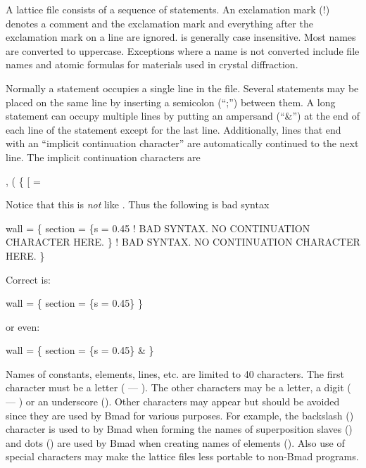 A \bmad lattice file consists of a sequence of statements. An
exclamation mark (!) denotes a comment and the exclamation mark and
everything after the exclamation mark on a line are ignored.  \bmad is
generally case insensitive. Most names are converted to
uppercase. Exceptions where a name is not converted include file names
and atomic formulas for materials used in crystal diffraction.

Normally a statement occupies a single line in the file. Several
statements may be placed on the same line by inserting a semicolon
(``;'') between them. A long statement can occupy multiple lines by
putting an ampersand (``\&'') at the end of each line of the statement
except for the last line. Additionally, lines that end with an
``implicit continuation character''
are automatically continued to the next line. The implicit continuation 
characters are
\begin{example}
  ,   (   \{   [   =
\end{example}
Notice
that this is {\em not} like . Thus the following is bad syntax
\begin{example}
  wall = \{
    section = \{s = 0.45     ! BAD SYNTAX. NO CONTINUATION CHARACTER HERE.
    \}                       ! BAD SYNTAX. NO CONTINUATION CHARACTER HERE.
  \}
\end{example}
Correct is:
\begin{example}
  wall = \{
    section = \{s = 0.45\} \}
\end{example}
or even:
\begin{example}
  wall = \{
    section = \{s = 0.45\} \&
  \}
\end{example}

Names of constants, elements, lines, etc. are limited to 40
characters. The first character must be a letter ( --- ).
The other characters may be a letter, a digit ( --- ) or
an underscore (\vn{_}). Other characters may appear but should be avoided
since they are used by Bmad for various purposes. For example, the 
backslash (\vn{\B}) character is used to by Bmad when forming the names of
superposition slaves () and dots () are used by Bmad 
when creating names of  elements (). Also use of
special characters may make the lattice files less portable to non-Bmad programs.

